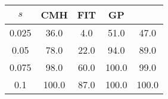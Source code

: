 \centering \begin{tabular}{c|c|c|c|c}
$s$	&CMH	&FIT	&GP	&\sc{Clear}\\\hline
0.025	&36.0	&4.0	&51.0	&47.0\\
0.05	&78.0	&22.0	&94.0	&89.0\\
0.075	&98.0	&60.0	&100.0	&99.0\\
0.1	&100.0	&87.0	&100.0	&100.0\\
\end{tabular}
